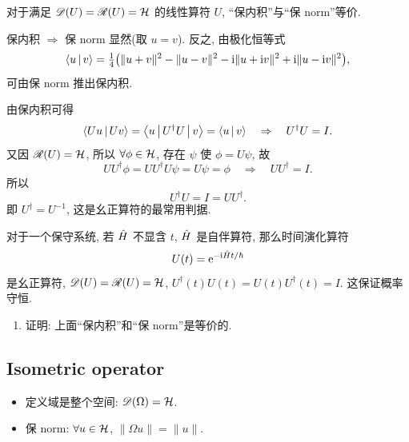 \begin{proposition}\label{prop:unitary-equivalent}
对于满足 $\mathscr D(U)=\mathscr R(U)=\mathcal{H}$ 的线性算符 $U$, ``保内积''与``保 norm''等价.
\end{proposition}

\begin{proof*}
保内积 $\Rightarrow$ 保 norm 显然(取 $u=v$). 反之, 由极化恒等式
\[\left\langle u \,\middle|\, v \right\rangle=\tfrac14\big(\|u+v\|^{2}-\|u-v\|^{2}-\mathrm{i}\|u+\mathrm{i} v\|^{2}+\mathrm{i}\|u-\mathrm{i} v\|^{2}\big),\]
可由保 norm 推出保内积.
\end{proof*}

由保内积可得
\begin{equation}
\left\langle Uu \,\middle|\, Uv \right\rangle=\left\langle u \,\middle|\, U^{\dagger}U \,\middle|\, v \right\rangle=\left\langle u \,\middle|\, v \right\rangle\quad\Rightarrow\quad U^{\dagger}U=I.
\end{equation}
又因 $\mathscr R(U)=\mathcal{H}$, 所以 $\forall \phi\in\mathcal{H}$, 存在 $\psi$ 使 $\phi=U\psi$, 故
\begin{equation}
U U^{\dagger}\phi=U U^{\dagger}U\psi=U\psi=\phi\quad\Rightarrow\quad U U^{\dagger}=I.
\end{equation}
所以
\begin{equation}\label{eq:unitary-twoways}
U^{\dagger}U=I=UU^{\dagger}.
\end{equation}
即 $U^{\dagger}=U^{-1}$, 这是幺正算符的最常用判据.

\begin{example}[时间演化]
对于一个保守系统, 若 $\hat{H}$ 不显含 $t$, $\hat{H}$ 是自伴算符, 那么时间演化算符
\begin{equation}
U(t)=\mathrm{e}^{-\mathrm{i}\hat{H} t/\hbar}
\end{equation}
是幺正算符, $\mathscr D(U)=\mathscr R(U)=\mathcal{H}$, $U^{\dagger}(t)U(t)=U(t)U^{\dagger}(t)=I$. 这保证概率守恒.
\end{example}

\begin{remark}[作业 3]
\begin{enumerate}
    \item 证明: 上面``保内积''和``保 norm''是等价的.
\end{enumerate}
\end{remark}

\subsection{Isometric operator}\label{subsec:isometric}

\begin{definition}
\begin{itemize}
    \item 定义域是整个空间: $\mathscr D(\Omega)=\mathcal{H}$.
    \item 保 norm: $\forall u\in\mathcal{H}$, $\|\Omega u\|=\|u\|$.
\end{itemize}
\end{definition}

